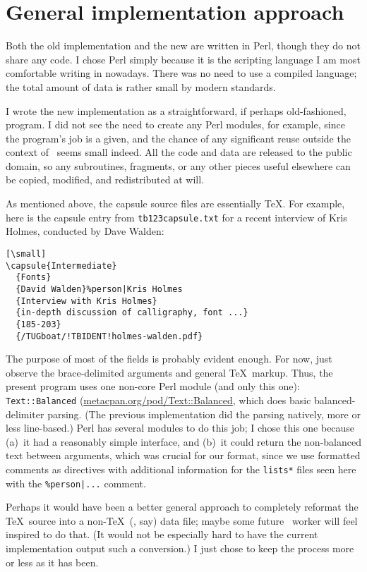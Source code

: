 \documentclass[final]{ltugboat}
\def\code#1{{\tt #1}}
\begin{document}
\section{General implementation approach}

Both the old implementation and the new are written in Perl, though they
do not share any code. I chose Perl simply because it is the scripting
language I am most comfortable writing in nowadays. There was no need to
use a compiled language; the total amount of data is rather small by
modern standards.

I wrote the new implementation as a straightforward, if perhaps
old-fashioned, program. I did not see the need to create any Perl
modules, for example, since the program's job is a given, and the chance
of any significant reuse outside the context of \TUB\ seems small
indeed. All the code and data are released to the public domain, so any
subroutines, fragments, or any other pieces useful elsewhere can be
copied, modified, and redistributed at will.

As mentioned above, the capsule source files are essentially \TeX. For
example, here is the capsule entry from \code{tb123capsule.txt} for a
recent interview of Kris Holmes, conducted by Dave Walden:

\begin{verbatim}[\small]
\capsule{Intermediate}
  {Fonts}
  {David Walden}%person|Kris Holmes
  {Interview with Kris Holmes}
  {in-depth discussion of calligraphy, font ...}
  {185-203}
  {/TUGboat/!TBIDENT!holmes-walden.pdf}
\end{verbatim}

\noindent The purpose of most of the fields is probably evident enough.
For now, just observe the brace-delimited arguments and general \TeX\
markup. Thus, the present program uses one non-core Perl module (and
only this one): \code{Text::Balanced}
(\url{metacpan.org/pod/Text::Balanced}, which does basic
balanced-delimiter parsing. (The previous implementation did the parsing
natively, more or less line-based.) Perl has several modules to do this
job; I chose this one because (a)~it had a reasonably simple interface,
and (b)~it could return the non-balanced text between arguments, which
was crucial for our format, since we use formatted comments as
directives with additional information for the \code{lists*} files\Dash
seen here with the \code{\%person|...} comment.

Perhaps it would have been a better general approach to completely
reformat the \TeX\ source into a non-\TeX\ (\acro{YAML}, say) data file;
maybe some future \TUB\ worker will feel inspired to do that. (It would
not be especially hard to have the current implementation output such a
conversion.) I just chose to keep the process more or less as it has
been.
\end{document}
